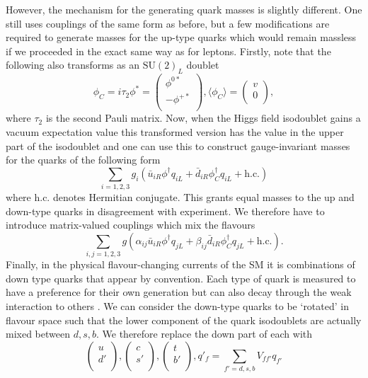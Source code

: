 However, the mechanism for the generating quark masses is slightly different. One still uses couplings of the same form as before, but a few modifications are required \cite{PDG} to generate masses for the up-type quarks which would remain massless if we proceeded in the exact same way as for leptons. Firstly, note that the following also transforms as an $\mathrm{SU}(2)_{L}$ doublet 
\begin{equation}
    \phi_{C} = i\tau_{2}\phi^{*} = 
    \begin{pmatrix}
        \phi^{0*} \\
        -\phi^{+*}\\
    \end{pmatrix},
    \langle{\phi_{C}}\rangle = 
    \begin{pmatrix} 
        v \\ 
        0 \\ 
    \end{pmatrix},
\end{equation}
where $\tau_{2}$ is the second Pauli matrix. Now, when the Higgs field isodoublet gains a vacuum expectation value this transformed version has the value in the upper part of the isodoublet and one can use this to construct gauge-invariant masses for the quarks of the following form
\begin{equation}
    \sum_{i=1,2,3}g_{i}(
    \bar{u}_{iR}\phi^{\dag}q_{iL} 
    + \bar{d}_{iR}\phi^{\dag}_{C}q_{iL}
    + \mathrm{h.c.})
\end{equation}
where h.c. denotes Hermitian conjugate. This grants equal masses to the up and down-type quarks in disagreement with experiment. We therefore have to introduce matrix-valued couplings which mix the flavours
\begin{equation}
    \sum_{i,j=1,2,3}g(
      \alpha_{ij}\bar{u}_{iR}\phi^{\dag}q_{jL} 
      + \beta_{ij}\bar{d}_{iR}\phi^{\dag}_{C}q_{jL}
      + \mathrm{h.c.}).
\end{equation}
Finally, in the physical flavour-changing currents of the SM it is combinations of down type quarks that appear by convention. Each type of quark is measured to have a preference for their own generation but can also decay through the weak interaction to others \cite{PDG}. We can consider the down-type quarks to be `rotated' in flavour space such that the lower component of the quark isodoublets are actually mixed between $d,s,b$. We therefore replace the down part of each with 
\begin{equation}
    \begin{pmatrix}
        u \\
        d{'} \\
    \end{pmatrix},
    \begin{pmatrix}
        c \\
        s{'} \\
    \end{pmatrix},
    \begin{pmatrix}
        t \\
        b{'} \\
    \end{pmatrix},
    q{'}_{f} = \sum_{f'=d,s,b}V_{ff'}q_{f'}
\end{equation}

